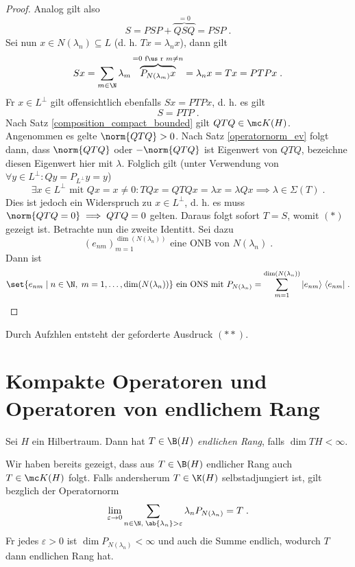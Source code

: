 \begin{theorem}
\begin{proof}
		Analog gilt also 
		\[S = PSP + \overbrace{QSQ}^{ = 0} = PSP\;.\]
		Sei nun \(x \in N(\lambda_n)\subseteq L\) (d. h. \(Tx  = \lambda_n x\)), dann gilt
		\[Sx = \sum_{m\in \N} \lambda_m \overbrace{P_{N(\lambda_m )} x}^{=0 \text{ f\us r } m\neq n} = \lambda_n x = Tx = PTP x\;.\]
		F\us r \(x \in L^\perp\) gilt offensichtlich ebenfalls \(Sx = PTPx\), d. h. es gilt
		\[S = PTP\;.\]
		Nach Satz \ref{composition_compact_bounded} gilt \(QTQ \in \mc K(H)\). Angenommen es gelte \(\norm{QTQ} > 0\). Nach Satz \ref{operatornorm_ev} folgt dann, dass \(\norm{QTQ}\) oder \(-\norm{QTQ}\) ist Eigenwert von \(QTQ\), bezeichne diesen Eigenwert hier mit \(\lambda\). Folglich gilt (unter Verwendung von \(\forall y\in L^\perp: Q y = P_{L^\perp} y = y\))
	\[\exists x \in L^\perp\text{ mit } Qx = x \neq 0: TQ x = QTQ x = \lambda x = \lambda Qx \implies \lambda \in \Sigma(T)\;.\]
	Dies ist jedoch ein Widerspruch zu \(x\in L^\perp\), d. h. es muss \(\norm{QTQ = 0} \implies QTQ = 0\) gelten. Daraus folgt sofort \(T = S\), womit \((*)\) gezeigt ist. Betrachte nun die zweite Identit\as t. Sei dazu
	\[ (e_{nm})_{m=1}^{\dim(N(\lambda_n))} \text{ eine ONB von } N(\lambda_n)\;.\]
	Dann ist 
	\[\set{e_{nm}\;\vert\; n\in\N,\; m = 1,\ldots, \dim(N(\lambda_n))}  \text{ ein ONS mit } P_{N(\lambda_n)} = \sum_{m=1}^{\dim(N(\lambda_n))} \vert e_{nm}\rangle \;\langle e_{nm} \vert\;. \]
	\end{proof}
	Durch Aufz\as hlen entsteht der geforderte Ausdruck \((**)\).
\end{theorem}

\section{Kompakte Operatoren und Operatoren von endlichem Rang}
\begin{definition}
	Sei $H$ ein Hilbertraum. Dann hat \(T\in \B(H)\) \textit{endlichen Rang}, falls \(\dim TH< \infty\).
\end{definition}
\begin{rem}
	Wir haben bereits gezeigt, dass aus \(T \in \B(H)\) endlicher Rang auch \(T\in\mc K(H)\) folgt. Falls andersherum \(T \in \K(H)\) selbstadjungiert ist, gilt bez\us glich der Operatornorm
	\[\lim_{\varepsilon\to 0} \sum_{n\in\N,\;\ab{\lambda_n} > \varepsilon} \lambda_n P_{N(\lambda_n)} = T\;.\]
	F\us r jedes \(\varepsilon > 0\) ist \(\dim P_{N(\lambda_n)}<\infty\) und auch die Summe endlich, wodurch $T$ dann endlichen Rang hat.
\end{rem}

